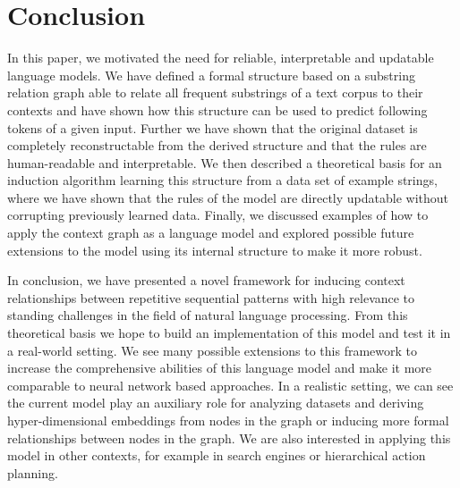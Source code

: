 \chapter{Conclusion}\label{chp:conclusion}

In this paper, we motivated the need for reliable, interpretable and updatable language models. We have defined a formal structure based on a substring relation graph able to relate all frequent substrings of a text corpus to their contexts and have shown how this structure can be used to predict following tokens of a given input. Further we have shown that the original dataset is completely reconstructable from the derived structure and that the rules are human-readable and interpretable. We then described a theoretical basis for an induction algorithm learning this structure from a data set of example strings, where we have shown that the rules of the model are directly updatable without corrupting previously learned data. Finally, we discussed examples of how to apply the context graph as a language model and explored possible future extensions to the model using its internal structure to make it more robust.

\noindent
In conclusion, we have presented a novel framework for inducing context relationships between repetitive sequential patterns with high relevance to standing challenges in the field of natural language processing. From this theoretical basis we hope to build an implementation of this model and test it in a real-world setting. We see many possible extensions to this framework to increase the comprehensive abilities of this language model and make it more comparable to neural network based approaches. In a realistic setting, we can see the current model play an auxiliary role for analyzing datasets and deriving hyper-dimensional embeddings from nodes in the graph or inducing more formal relationships between nodes in the graph. We are also interested in applying this model in other contexts, for example in search engines or hierarchical action planning.
